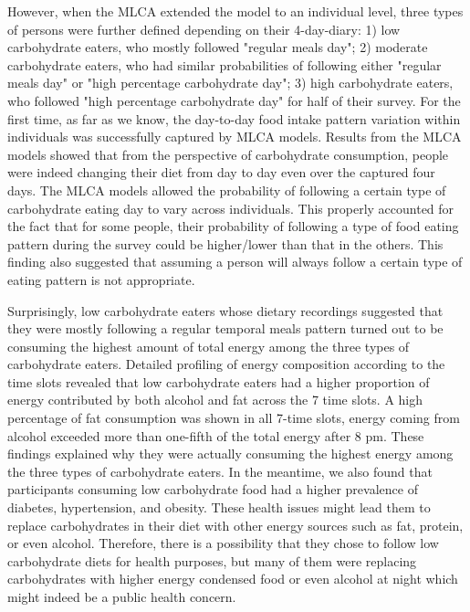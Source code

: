 However, when the MLCA extended the model to an individual level, three types of persons were further defined depending on their 4-day-diary: 1) low carbohydrate eaters, who mostly followed "regular meals day"; 2) moderate carbohydrate eaters, who had similar probabilities of following either "regular meals day" or "high percentage carbohydrate day"; 3) high carbohydrate eaters, who followed "high percentage carbohydrate day" for half of their survey. For the first time, as far as we know, the day-to-day food intake pattern variation within individuals was successfully captured by MLCA models. Results from the MLCA models showed that from the perspective of carbohydrate consumption, people were indeed changing their diet from day to day even over the captured four days. The MLCA models allowed the probability of following a certain type of carbohydrate eating day to vary across individuals. This properly accounted for the fact that for some people, their probability of following a type of food eating pattern during the survey could be higher/lower than that in the others. This finding also suggested that assuming a person will always follow a certain type of eating pattern is not appropriate.

Surprisingly, low carbohydrate eaters whose dietary recordings suggested that they were mostly following a regular temporal meals pattern turned out to be consuming the highest amount of total energy among the three types of carbohydrate eaters. Detailed profiling of energy composition according to the time slots revealed that low carbohydrate eaters had a higher proportion of energy contributed by both alcohol and fat across the 7 time slots. A high percentage of fat consumption was shown in all 7-time slots, energy coming from alcohol exceeded more than one-fifth of the total energy after 8 pm. These findings explained why they were actually consuming the highest energy among the three types of carbohydrate eaters. In the meantime, we also found that participants consuming low carbohydrate food had a higher prevalence of diabetes, hypertension, and obesity. These health issues might lead them to replace carbohydrates in their diet with other energy sources such as fat, protein, or even alcohol. Therefore, there is a possibility that they chose to follow low carbohydrate diets for health purposes, but many of them were replacing carbohydrates with higher energy condensed food or even alcohol at night which might indeed be a public health concern. 

